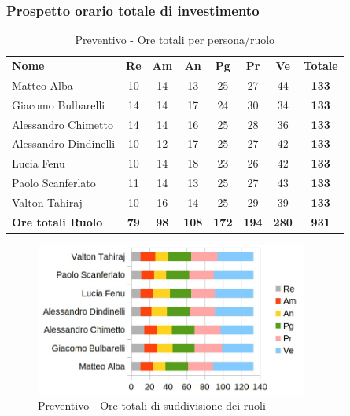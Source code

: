 	\subsubsection{Prospetto orario totale di investimento}

		\begin{table} [h!]
			\begin{center}
				\begin{tabular} { m{3.5cm} c c c c c c c }
					\rowcolor{lightgray}
					\textbf{Nome} & \textbf{Re} & \textbf{Am} & \textbf{An} & \textbf{Pg} & \textbf{Pr} & \textbf{Ve} & \textbf{Totale} \\
					Matteo Alba & 10 & 14 & 13 & 25 & 27 & 44 & \textbf{133} \\
					Giacomo Bulbarelli & 14 & 14 & 17 & 24 & 30 & 34 & \textbf{133} \\
					Alessandro Chimetto & 14 & 14 & 16 & 25 & 28 & 36 & \textbf{133} \\
					Alessandro Dindinelli & 10 & 12 & 17 & 25 & 27 & 42 & \textbf{133} \\
					Lucia Fenu & 10 & 14 & 18 & 23 & 26 & 42 & \textbf{133} \\
					Paolo Scanferlato & 11 & 14 & 13 & 25 & 27 & 43 & \textbf{133} \\
					Valton Tahiraj & 10 & 16 & 14 & 25 & 29 & 39 & \textbf{133} \\
					\textbf{Ore totali Ruolo} & \textbf{79} & \textbf{98} & \textbf{108} & \textbf{172} & \textbf{194}& \textbf{280} & \textbf{931}
				\end{tabular}
				\caption{Preventivo - Ore totali per persona/ruolo}
			\end{center}
		\end{table}
	
		\begin{figure} [h!]
			\centering
			\includegraphics[width=0.8\textwidth]{res/img/grafici/ore_totali_di_investimento.jpg}
			\caption{Preventivo - Ore totali di suddivisione dei ruoli} 
		\end{figure}
	
